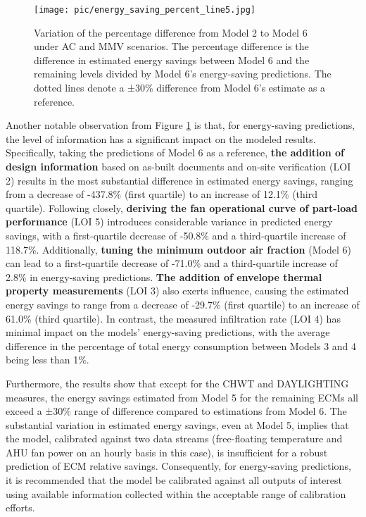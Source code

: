 \documentclass[3p,times,12pt]{elsarticle}
\begin{document}
\begin{sloppypar}
\begin{figure}[H]
\centering\texttt{[image: pic/energy\_saving\_percent\_line5.jpg]}
\caption{Variation of the percentage difference from Model 2 to Model 6 under AC and MMV scenarios. The percentage difference is the difference in estimated energy savings between Model 6 and the remaining levels divided by Model 6's energy-saving predictions. The dotted lines denote a ±30\% difference from Model 6's estimate as a reference.}
\label{fig:savings_MM}
\end{figure}

Another notable observation from Figure \ref{fig:savings_MM} is that, for energy-saving predictions, the level of information has a significant impact on the modeled results. Specifically, taking the predictions of Model 6 as a reference, \textbf{the addition of design information} based on as-built documents and on-site verification (LOI 2) results in the most substantial difference in estimated energy savings, ranging from a decrease of -437.8\% (first quartile) to an increase of 12.1\% (third quartile). Following closely, \textbf{deriving the fan operational curve of part-load performance} (LOI 5) introduces considerable variance in predicted energy savings, with a first-quartile decrease of -50.8\% and a third-quartile increase of 118.7\%. Additionally, \textbf{tuning the minimum outdoor air fraction} (Model 6) can lead to a first-quartile decrease of -71.0\% and a third-quartile increase of 2.8\% in energy-saving predictions. \textbf{The addition of envelope thermal property measurements} (LOI 3) also exerts influence, causing the estimated energy savings to range from a decrease of -29.7\% (first quartile) to an increase of 61.0\% (third quartile). In contrast, the measured infiltration rate (LOI 4) has minimal impact on the models' energy-saving predictions, with the average difference in the percentage of total energy consumption between Models 3 and 4 being less than 1\%.

Furthermore, the results show that except for the CHWT and DAYLIGHTING measures, the energy savings estimated from Model 5 for the remaining ECMs all exceed a ±30\% range of difference compared to estimations from Model 6. The substantial variation in estimated energy savings, even at Model 5, implies that the model, calibrated against two data streams (free-floating temperature and AHU fan power on an hourly basis in this case), is insufficient for a robust prediction of ECM relative savings. Consequently, for energy-saving predictions, it is recommended that the model be calibrated against all outputs of interest using available information collected within the acceptable range of calibration efforts.



\end{sloppypar}
\end{document}
